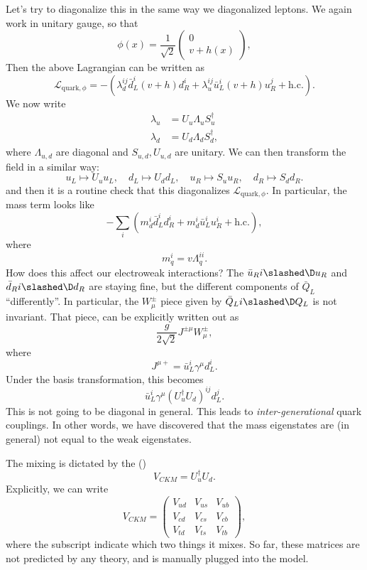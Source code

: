\documentclass[a4paper]{article}
\begin{document}
Let's try to diagonalize this in the same way we diagonalized leptons. We again work in unitary gauge, so that
\[
  \phi(x) = \frac{1}{\sqrt{2}}
  \begin{pmatrix}
    0\\
    v + h(x)
  \end{pmatrix},
\]
Then the above Lagrangian can be written as
\[
  \mathcal{L}_{\mathrm{quark}, \phi} = - (\lambda_d^{ij} \bar{d}_L^i (v + h) d_R^i + \lambda_u^{ij} \bar{u}_L^i (v + h) u_R^j + \mathrm{h.c.}).
\]
We now write
\begin{align*}
  \lambda_u &= U_u \Lambda_u S_u^\dagger\\
  \lambda_d &= U_d \Lambda_d S_d^\dagger,
\end{align*}
where $\Lambda_{u, d}$ are diagonal and $S_{u, d}, U_{u, d}$ are unitary. We can then transform the field in a similar way:
\[
  u_L \mapsto U_u u_L,\quad d_L \mapsto U_d d_L,\quad u_R \mapsto S_u u_R,\quad d_R \mapsto S_d d_R.
\]
and then it is a routine check that this diagonalizes $\mathcal{L}_{\mathrm{quark}, \phi}$. In particular, the mass term looks like
\[
  -\sum_i (m_d^i \bar{d}_L^i d_R^i + m_d^i \bar{u}_L^i u_R^i + \text{h.c.}),
\]
where
\[
  m_q^i = v \Lambda_q^{ii}.
\]
How does this affect our electroweak interactions? The $\bar{u}_R i \slashed \D u_R$ and $\bar{d}_R i \slashed \D d_R$ are staying fine, but the different components of $\bar{Q}_L$ ``differently''. In particular, the $W_\mu^{\pm}$ piece given by $\bar{Q}_L i \slashed \D Q_L$ is not invariant. That piece, can be explicitly written out as
\[
  \frac{g}{2\sqrt{2}} J^{\pm \mu} W_{\mu}^{\pm},
\]
where
\[
  J^{\mu+} = \bar{u}_L^i \gamma^\mu d_L^i.
\]
Under the basis transformation, this becomes
\[
  \bar{u}_L^i \gamma^\mu (U_u^\dagger U_d)^{ij} d_L^j.
\]
This is not going to be diagonal in general. This leads to \emph{inter-generational} quark couplings. In other words, we have discovered that the mass eigenstates are (in general) not equal to the weak eigenstates.

The mixing is dictated by the  ()
\[
  V_{CKM} = U^\dagger_u U_d.
\]
Explicitly, we can write
\[
  V_{CKM} =
  \begin{pmatrix}
    V_{ud} & V_{us} & V_{ub}\\
    V_{cd} & V_{cs} & V_{cb}\\
    V_{td} & V_{ts} & V_{tb}
  \end{pmatrix},
\]
where the subscript indicate which two things it mixes. So far, these matrices are not predicted by any theory, and is manually plugged into the model.
\end{document}
